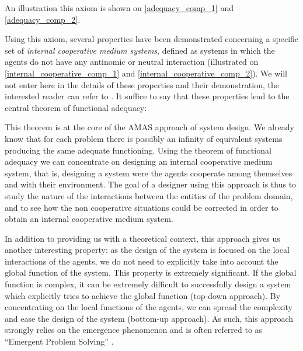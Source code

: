 An illustration this axiom is shown on \figurename{} \ref{adequacy_comp_1} and \figurename{} \ref{adequacy_comp_2}.



Using this axiom, several properties have been demonstrated concerning a specific set of \emph{internal cooperative medium systems}, defined as systems in which the agents do not have any antinomic or neutral interaction (illustrated on \figurename{} \ref{internal_cooperative_comp_1} and \figurename{} \ref{internal_cooperative_comp_2}). We will not enter here in the details of these properties and their demonstration, the interested reader can refer to \cite{glize2001adaptation, gleizes1999theory}. It suffice to say that these properties lead to the central theorem of functional adequacy:


This theorem is at the core of the AMAS approach of system design. We already know that for each problem there is possibly an infinity of equivalent systems producing the same adequate functioning. Using the theorem of functional adequacy we can concentrate on designing an internal cooperative medium system, that is, designing a system were the agents cooperate among themselves and with their environment. The goal of a designer using this approach is thus to study the nature of the interactions between the entities of the problem domain, and to see how the non cooperative situations could be corrected in order to obtain an internal cooperative medium system.

In addition to providing us with a theoretical context, this approach gives us another interesting property: as the design of the system is focused on the local interactions of the agents, we do not need to explicitly take into account the global function of the system. This property is extremely significant. If the global function is complex, it can be extremely difficult to successfully design a system which explicitly tries to achieve the global function (top-down approach). By concentrating on the local functions of the agents, we can spread the complexity and ease the design of the system (bottom-up approach). As such, this approach strongly relies on the emergence phenomenon and is often referred to as \enquote{Emergent Problem Solving} \cite{quinqueton2000emergent}.

